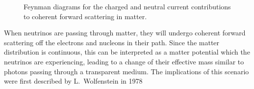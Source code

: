 \begin{figure}
 \centering
 \hspace{2cm}
 \caption{Feynman diagrams for the charged \protect{} and
  neutral \protect{} current contributions to coherent forward
  scattering in matter.}
\label{fig:coherent_scattering}
\end{figure}

When neutrinos are passing through matter, they will undergo coherent forward
scattering off the electrons and nucleons in their path. Since the matter
distribution is continuous, this can be interpreted as a matter potential which
the neutrinos are experiencing, leading to a change of their effective mass
similar to photons passing through a transparent medium. The implications of
this scenario were first described by L.\ Wolfenstein in 1978 \cite{Wolfenstein}

